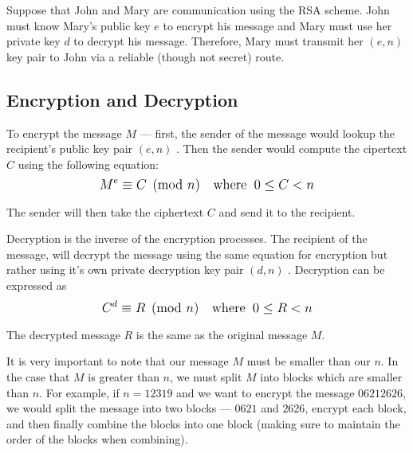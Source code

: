 Suppose that John and Mary are communication using the RSA scheme. John must know Mary's public key $e$ to encrypt his message and Mary must use her private key $d$ to 
decrypt his message. Therefore, Mary must transmit her $(e,n)$ key pair to John via a reliable (though not secret) route. 

\subsection{Encryption and Decryption}

To encrypt the message $M$ --- first, the sender of the message would lookup the recipient's public key pair $(e,n)$ \cite{classical_algebra}. 
Then the sender would compute the cipertext $C$ using the following equation: 
$$\mathlarger{M^e \equiv C \pmod{n} \text{\hspace{1em}where\;\;}0 \leq C < n}$$

The sender will then take the ciphertext $C$ and send it to the recipient.

Decryption is the inverse of the encryption processes. The recipient of the message, will decrypt the message using the same equation for encryption but rather using it's
own private decryption key pair $(d,n)$ \cite{classical_algebra}. Decryption can be expressed as 
$$\mathlarger{C^d \equiv R \pmod{n} \text{\hspace{1em}where\;\;}0 \leq R < n}$$

The decrypted message $R$ is the same as the original message $M$.

It is very important to note that our message $M$ must be smaller than our $n$. In the case that $M$ is greater than $n$, we must split $M$ into blocks which are smaller
than $n$. For example, if $n=12319$ and we want to encrypt the message $06212626$, we would split the message into two blocks --- $0621$ and $2626$, encrypt each block, 
and then finally combine the blocks into one block (making sure to maintain the order of the blocks when combining).
